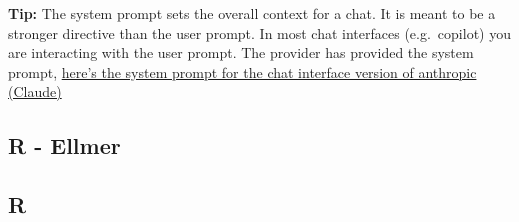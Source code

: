 \documentclass[
  letterpaper,
  DIV=11,
  numbers=noendperiod]{scrreprt}
\newenvironment{Shaded}{\begin{snugshade}}{\end{snugshade}}
\newcommand{\AttributeTok}[1]{\textcolor[rgb]{0.40,0.45,0.13}{#1}}
\newcommand{\DecValTok}[1]{\textcolor[rgb]{0.68,0.00,0.00}{#1}}
\newcommand{\FunctionTok}[1]{\textcolor[rgb]{0.28,0.35,0.67}{#1}}
\newcommand{\NormalTok}[1]{\textcolor[rgb]{0.00,0.23,0.31}{#1}}
\newcommand{\OtherTok}[1]{\textcolor[rgb]{0.00,0.23,0.31}{#1}}
\newcommand{\SpecialCharTok}[1]{\textcolor[rgb]{0.37,0.37,0.37}{#1}}
\newcommand{\StringTok}[1]{\textcolor[rgb]{0.13,0.47,0.30}{#1}}
\begin{document}
\textbf{Tip:} The system prompt sets the overall context for a chat. It
is meant to be a stronger directive than the user prompt. In most chat
interfaces (e.g.~copilot) you are interacting with the user prompt. The
provider has provided the system prompt,
\href{https://www.reddit.com/r/ClaudeAI/comments/1ixapi4/here_is_claude_sonnet_37_full_system_prompt/}{here's
the system prompt for the chat interface version of anthropic (Claude)}

\subsection{R - Ellmer}

\begin{Shaded}
\end{Shaded}

\subsection{R}
\end{document}
